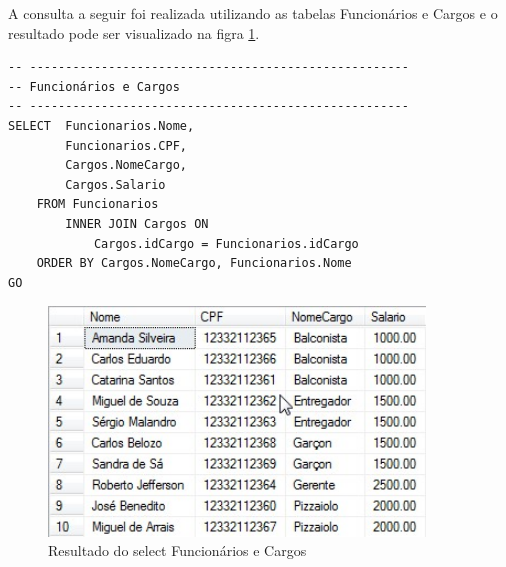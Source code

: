 \documentclass[
	12pt,				%
	openright,			%
	oneside,			%
	a4paper,			%
	chapter=TITLE,		%
	section=TITLE,		%
	english,			%
	brazil				%
	]{abntex2}
\begin{document}
    \newpage
    
    A consulta a seguir foi realizada utilizando as tabelas Funcionários e Cargos
    e o resultado pode ser visualizado na figra \ref{select07}. 
    \begin{lstlisting}
-- -----------------------------------------------------
-- Funcionários e Cargos
-- -----------------------------------------------------
SELECT  Funcionarios.Nome, 
        Funcionarios.CPF, 
        Cargos.NomeCargo, 
        Cargos.Salario 
    FROM Funcionarios
	    INNER JOIN Cargos ON
	        Cargos.idCargo = Funcionarios.idCargo
	ORDER BY Cargos.NomeCargo, Funcionarios.Nome
GO  
    \end{lstlisting}
    \begin{figure}[h]
         \centering
         \includegraphics[width=10cm,keepaspectratio]{Imgs/Select_007}
         \caption{Resultado do select Funcionários e Cargos}
         \label{select07}
    \end{figure}    
    
    \newpage
    
\end{document}
